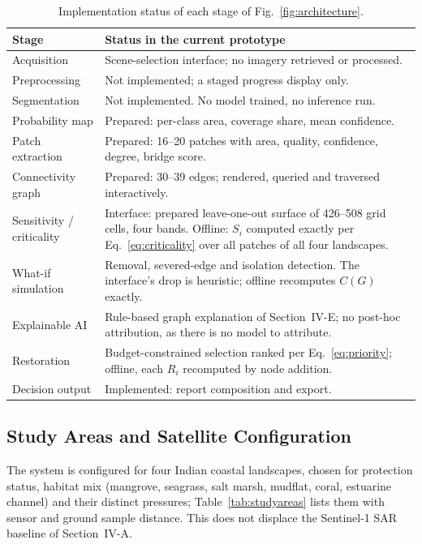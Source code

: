 \documentclass[conference]{IEEEtran}
\begin{document}
\begin{table}[!tbp]
\centering
\caption{Implementation status of each stage of Fig.~\ref{fig:architecture}.}
\label{tab:implstatus}
\tiny
\renewcommand{\arraystretch}{0.95}
\begin{tabularx}{\columnwidth}{@{}p{1.55cm}>{\raggedright\arraybackslash}X@{}}
\toprule
\textbf{Stage} & \textbf{Status in the current prototype} \\
\midrule
Acquisition & Scene-selection interface; no imagery retrieved or processed. \\
Preprocessing & Not implemented; a staged progress display only. \\
Segmentation & Not implemented. No model trained, no inference run. \\
Probability map & Prepared: per-class area, coverage share, mean confidence. \\
Patch extraction & Prepared: 16--20 patches with area, quality, confidence, degree, bridge score. \\
Connectivity graph & Prepared: 30--39 edges; rendered, queried and traversed interactively. \\
Sensitivity / criticality & Interface: prepared leave-one-out surface of 426--508 grid cells, four bands. Offline: $S_i$ computed exactly per Eq.~\eqref{eq:criticality} over all patches of all four landscapes. \\
What-if simulation & Removal, severed-edge and isolation detection. The interface's drop is heuristic; offline recomputes $C(G)$ exactly. \\
Explainable AI & Rule-based graph explanation of Section~IV-E; no post-hoc attribution, as there is no model to attribute. \\
Restoration & Budget-constrained selection ranked per Eq.~\eqref{eq:priority}; offline, each $R_i$ recomputed by node addition. \\
Decision output & Implemented: report composition and export. \\
\bottomrule
\end{tabularx}
\end{table}

\subsection{Study Areas and Satellite Configuration}

The system is configured for four Indian coastal landscapes, chosen for protection status, habitat mix (mangrove, seagrass, salt marsh, mudflat, coral, estuarine channel) and their distinct pressures; Table~\ref{tab:studyareas} lists them with sensor and ground sample distance. This does not displace the Sentinel-1 SAR baseline of Section~IV-A.
\end{document}

